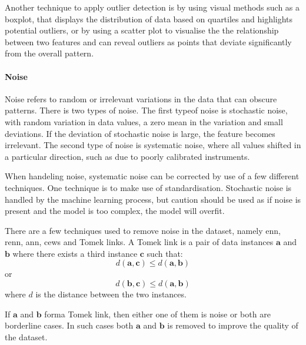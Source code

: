 \documentclass[10pt, conference]{IEEEtran}
\begin{document}
Another technique to apply outlier detection is by using visual methods such as a boxplot, that displays the
distribution of data based on quartiles and highlights potential outliers, or by using a scatter plot to visualise
the the relationship between two features and can reveal outliers as points that deviate significantly from the
overall pattern.

\paragraph{Noise}

Noise refers to random or irrelevant variations in the data that can obscure patterns. There is two types of noise.
The first typeof noise is stochastic noise, with random variation in data values, a zero mean in the variation and
small deviations. If the deviation of stochastic noise is large, the feature becomes irrelevant. The second type
of noise is systematic noise, where all values shifted in a particular direction, such as due to poorly calibrated
instruments.

When handeling noise, systematic noise can be corrected by use of a few different techniques. One technique is to
make use of standardisation. Stochastic noise is handled by the machine learning process, but caution should be
used as if noise is present and the model is too complex, the model will overfit.

There are a few techniques used to remove noise in the dataset, namely \acrfull{enn}, \acrfull{renn}, \acrfull{ann},
\acrfull{cews} and Tomek links. A Tomek link is a pair of data instances $\boldsymbol{\textbf{a}}$ and
$\boldsymbol{\textbf{b}}$ where there exists a third instance $\boldsymbol{\textbf{c}}$ such that:
\begin{equation}
    d(\boldsymbol{\textbf{a}}, \boldsymbol{\textbf{c}}) \leq d(\boldsymbol{\textbf{a}}, \boldsymbol{\textbf{b}}) \label{tomek_1}
\end{equation}
or
\begin{equation}
    d(\boldsymbol{\textbf{b}}, \boldsymbol{\textbf{c}}) \leq d(\boldsymbol{\textbf{a}}, \boldsymbol{\textbf{b}}) \label{tomek_2}
\end{equation}
where $d$ is the distance between the two instances.

If $\boldsymbol{\textbf{a}}$ and $\boldsymbol{\textbf{b}}$ forma Tomek link, then either one of them is noise
or both are borderline cases. In such cases both $\boldsymbol{\textbf{a}}$ and $\boldsymbol{\textbf{b}}$
is removed to improve the quality of the dataset.
\end{document}
